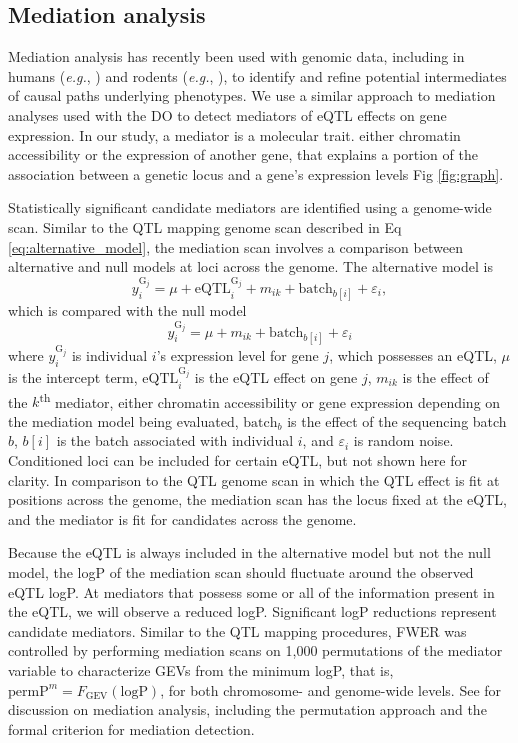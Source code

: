 \documentclass[10pt,letterpaper]{article}
\newcommand{\eg}{\emph{e.g.}\xspace}
\newcommand{\permpmed}{\text{permP}^{m}}
\begin{document}
\subsection*{Mediation analysis}

Mediation analysis has recently been used with genomic data, including in humans (\eg, \cite{Battle2014}) and rodents (\eg, \cite{Keele2018,Oreper2018}), to identify and refine potential intermediates of causal paths underlying phenotypes. We use a similar approach to mediation analyses used with the DO \cite{Chick2016, Keller2018} to detect mediators of eQTL effects on gene expression. In our study, a mediator is a molecular trait. either chromatin accessibility or the expression of another gene, that explains a portion of the association between a genetic locus and a gene's expression levels Fig \ref{fig:graph}.

Statistically significant candidate mediators are identified using a genome-wide scan. 
Similar to the QTL mapping genome scan described in Eq \ref{eq:alternative_model}, the mediation scan involves a comparison between alternative and null models at loci across the genome. The alternative model is
\begin{equation}
y^{\text{G}_{j}}_{i} = \mu + \text{eQTL}_{i}^{\text{G}_{j}} + m_{ik} + \text{batch}_{b[i]} + \varepsilon_{i},
\label{eq:mediation_alt}
\end{equation}
which is compared with the null model
\begin{equation}
y^{\text{G}_{j}}_{i} = \mu + m_{ik} \nonumber + \text{batch}_{b[i]} + \varepsilon_{i}
\label{eq:mediation_null}
\end{equation}
where $y^{\text{G}_{j}}_{i}$ is individual $i$'s expression level for gene $j$, which possesses an eQTL, $\mu$ is the intercept term, $\text{eQTL}_{i}^{\text{G}_{j}}$ is the eQTL effect on gene $j$, $m_{ik}$ is the effect of the $k$\textsuperscript{th} mediator, either chromatin accessibility or gene expression depending on the mediation model being evaluated, $\text{batch}_{b}$ is the effect of the sequencing batch $b$, $b[i]$ is the batch associated with individual $i$, and $\varepsilon_{i}$ is random noise. Conditioned loci can be included for certain eQTL, but not shown here for clarity. In comparison to the QTL genome scan in which the QTL effect is fit at positions across the genome, the mediation scan has the locus fixed at the eQTL, and the mediator is fit for candidates across the genome.

Because the eQTL is always included in the alternative model but not the null model, the logP of the mediation scan should fluctuate around the observed eQTL logP. At mediators that possess some or all of the information present in the eQTL, we will observe a reduced logP. Significant logP reductions represent candidate mediators. Similar to the QTL mapping procedures, FWER was controlled by performing mediation scans on 1,000 permutations of the mediator variable to characterize GEVs from the minimum logP, that is, $\permpmed = F_{\text{GEV}}(\text{logP})$, for both chromosome- and genome-wide levels. See  for discussion on mediation analysis, including the permutation approach and the formal criterion for mediation detection.
\end{document}
